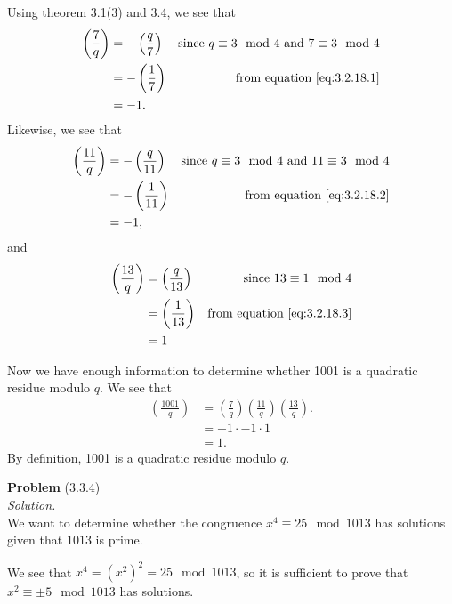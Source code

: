 \documentclass[12 pt]{amsart}
\begin{document}
  Using theorem 3.1(3) and 3.4, we see that
  \begin{align*}
    \left( \frac{7}{q} \right)
    &=
    -\left( \frac{q}{7} \right) & \text{since $q \equiv 3 \mod 4$ 
                                        and $7 \equiv 3 \mod 4$}\\
    &=
     -\left( \frac{1}{7} \right) & \text{from equation \ref{eq:3.2.18.1}}\\
    &=
      -1.
  \end{align*}
  Likewise, we see that
  \begin{align*}
    \left( \frac{11}{q} \right)
    &=
    -\left( \frac{q}{11} \right) & \text{since $q \equiv 3 \mod 4$ 
                                        and $11 \equiv 3 \mod 4$}\\
    &=
     -\left( \frac{1}{11} \right) & \text{from equation \ref{eq:3.2.18.2}}\\
    &=
      -1,
  \end{align*}
  and 
  \begin{align*}
    \left( \frac{13}{q} \right)
    &=
      \left( \frac{q}{13} \right) & \text{since $13 \equiv 1 \mod 4$}\\
    &=
      \left( \frac{1}{13} \right) & \text{from equation \ref{eq:3.2.18.3}}\\
    &=
      1
  \end{align*}

  Now we have enough information to determine whether 1001 is
  a quadratic residue modulo $q$.
  We see that
  \begin{align*}
    \left( \frac{1001}{q} \right)
    &=
      \left( \frac{7}{q} \right)
      \left( \frac{11}{q} \right)
      \left( \frac{13}{q} \right). \\
    &=
      -1 \cdot -1 \cdot 1 \\
    &= 
      1.
  \end{align*}
  By definition, 1001 is a quadratic residue modulo $q$.

\vfill
\newpage



\phantom{\quad} \vfill
\noindent
\textbf{Problem} (3.3.4) \\[4ex]
\emph{Solution.} \\[2ex]
  We want to determine whether 
  the congruence
  $x^4 \equiv 25 \mod 1013$ 
  has solutions given that $1013$ is prime.

  We see that 
  $x^4 = \left( x^2 \right)^2 = 25 \mod 1013$,
  so it is sufficient to prove that
  $x^2 \equiv \pm 5 \mod 1013$ has solutions.
\end{document}
